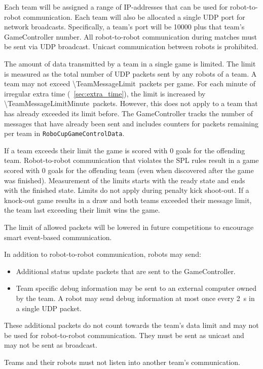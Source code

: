 Each team will be assigned a range of IP-addresses that can be used for robot-to-robot communication. Each team will also be allocated a single UDP port for network broadcasts. Specifically, a team's port will be 10000 plus that team's GameController number. All robot-to-robot communication during matches must be sent via UDP broadcast. Unicast communication between robots is prohibited.

The amount of data transmitted by a team in a single game is limited. The limit is measured as the total number of UDP packets sent by any robots of a team. A team may not exceed \qty{\TeamMessageLimit}{packets} per game. For each minute of irregular extra time (\cf~\cref{sec:extra_time}), the limit is increased by \qty{\TeamMessageLimitMinute}{packets}. However, this does not apply to a team that has already exceeded its limit before. The GameController tracks the number of messages that have already been sent and includes counters for packets remaining per team in \texttt{RoboCupGameControlData}.

If a team exceeds their limit the game is scored with 0 goals for the offending team. Robot-to-robot communication that violates the SPL rules result in a game scored with 0 goals for the offending team (even when discovered after the game was finished). Measurement of the limits starts with the ready state and ends with the finished state. Limits do not apply during penalty kick shoot-out. If a knock-out game results in a draw and both teams exceeded their message limit, the team last exceeding their limit wins the game.

The limit of allowed packets will be lowered in future competitions to encourage smart event-based communication.

In addition to robot-to-robot communication, robots may send:
\begin{itemize}
 \item Additional status update packets that are sent to the GameController.
 \item Team specific debug information may be sent to an external computer owned by the team. A robot may send debug information at most once every \qty{2}{\second} in a single UDP packet.
\end{itemize}
These additional packets do not count towards the team's data limit and may not be used for robot-to-robot communication. They must be sent as unicast and may not be sent as broadcast.

Teams and their robots must not listen into another team's communication.

